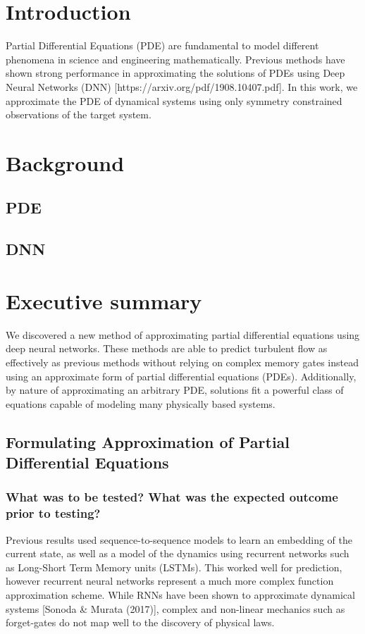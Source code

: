 \documentclass[12pt]{article}
\theoremstyle{plain}
\theoremstyle{remark}
\theoremstyle{definition}
\begin{document}

    \section[Intro]{Introduction}
    \label{sec:intro}
    Partial Differential Equations (PDE) are fundamental to model different phenomena in science and engineering
    mathematically.
    Previous methods have shown strong performance in approximating the solutions of PDEs using Deep Neural Networks
    (DNN) [https://arxiv.org/pdf/1908.10407.pdf].
    In this work, we approximate the PDE of dynamical systems using only symmetry constrained observations of the
    target system.

    \section{Background}
    \label{sec:background}
        \subsection{PDE}
        \subsection{DNN}




    \section{Executive summary}

    We discovered a new method of approximating partial differential equations using deep neural networks. These methods are able to predict turbulent flow as effectively as previous methods without relying on complex memory gates instead using an approximate form of partial differential equations (PDEs). Additionally, by nature of approximating an arbitrary PDE, solutions fit a powerful class of equations capable of modeling many physically based systems.

    \subsection{Formulating Approximation of Partial Differential Equations}

    \subsubsection{What was to be tested? What was the expected outcome prior to testing?}
    Previous results used sequence-to-sequence models to learn an embedding of the current state, as well as a model of the dynamics using recurrent networks such as Long-Short Term Memory units (LSTMs). This worked well for prediction, however recurrent neural networks represent a much more complex function approximation scheme. While RNNs have been shown to approximate dynamical systems [Sonoda \& Murata (2017)], complex and non-linear mechanics such as forget-gates do not map well to the discovery of physical laws.
\end{document}
